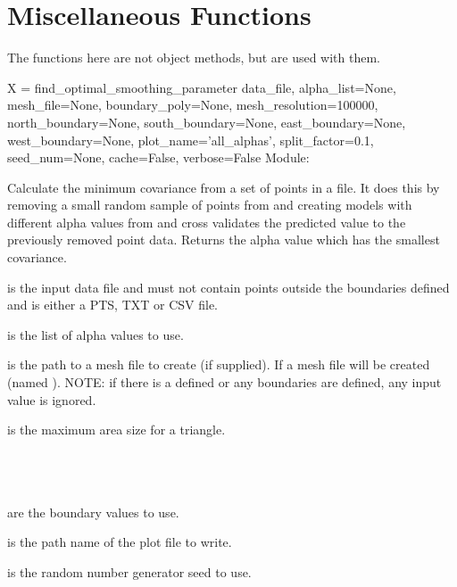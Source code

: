 \documentclass{manual}
\begin{document}
\section{Miscellaneous Functions}

The functions here are not  object methods, but are used with them.

\begin{methoddesc}{X = find_optimal_smoothing_parameter}
                  {data_file,
                   alpha_list=None,
                   mesh_file=None,
                   boundary_poly=None,
                   mesh_resolution=100000,
                   north_boundary=None,
                   south_boundary=None,
                   east_boundary=None,
                   west_boundary=None,
                   plot_name='all_alphas',
                   split_factor=0.1,
                   seed_num=None,
                   cache=False,
                   verbose=False}
Module: 

Calculate the minimum covariance from a set of points in a file.  It does this
by removing a small random sample of points from  and creating
models with different alpha values from  and cross validates
the predicted value to the previously removed point data. Returns the
alpha value which has the smallest covariance.

 is the input data file and must not contain points outside
the boundaries defined and is either a PTS, TXT or CSV file.

 is the list of alpha values to use.

 is the path to a mesh file to create (if supplied).
If  a mesh file will be created (named ).
NOTE: if there is a  defined or any boundaries are defined,
any input  value is ignored.

 is the maximum area size for a triangle.

\\
\\
\\
 are the boundary values to use.

 is the path name of the plot file to write.

 is the random number generator seed to use.


\end{methoddesc}
\end{document}
